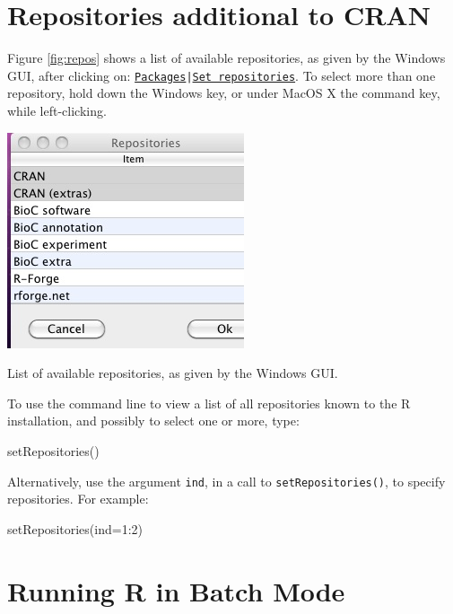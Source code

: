 \documentclass{tufte-book}\usepackage[]{graphicx}\usepackage[]{color}
\newcommand{\txtt}[1]{\texttt{#1}}
\begin{document}
\section{Repositories additional to CRAN}\label{sec:repos}

Figure \ref{fig:repos} shows a list of available repositories, as given by
the Windows GUI, after clicking on:
\txtt{\underline{Packages}}\txtt{|}\txtt{\underline{Set repositories}}.
To select more than one repository, hold down the Windows key, or
under MacOS X the command key, while left-clicking.

\begin{marginfigure}
\includegraphics{figs-inc/16i-repos.jpg}
\caption{List of available repositories, as given by the Windows
  GUI.}\label{fig:repos}
\end{marginfigure}

To use the command line to view a list of all repositories known to the R
installation, and possibly to select one or more, type:
\begin{Schunk}
\begin{Sinput}
setRepositories()
\end{Sinput}
\end{Schunk}
Alternatively, use the argument \txtt{ind}, in a call to
\txtt{setRepositories()}, to specify repositories.  For example:
\begin{Schunk}
\begin{Sinput}
setRepositories(ind=1:2)
\end{Sinput}
\end{Schunk}

\section{Running R in Batch Mode}

\end{document}
